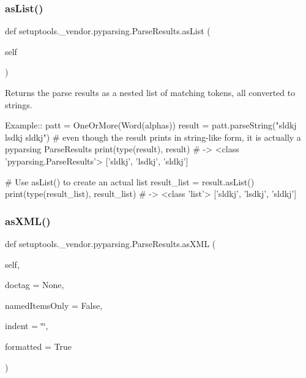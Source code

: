 \subsubsection{\texorpdfstring{as\+List()}{asList()}}
{\footnotesize\ttfamily def setuptools.\+\_\+vendor.\+pyparsing.\+Parse\+Results.\+as\+List (\begin{DoxyParamCaption}\item[{}]{self }\end{DoxyParamCaption})}

\begin{DoxyVerb}Returns the parse results as a nested list of matching tokens, all converted to strings.

Example::
    patt = OneOrMore(Word(alphas))
    result = patt.parseString("sldkj lsdkj sldkj")
    # even though the result prints in string-like form, it is actually a pyparsing ParseResults
    print(type(result), result) # -> <class 'pyparsing.ParseResults'> ['sldkj', 'lsdkj', 'sldkj']
    
    # Use asList() to create an actual list
    result_list = result.asList()
    print(type(result_list), result_list) # -> <class 'list'> ['sldkj', 'lsdkj', 'sldkj']
\end{DoxyVerb}
 \mbox{\label{classsetuptools_1_1__vendor_1_1pyparsing_1_1_parse_results_a1ef3733e1f8c5c2ad4a759b9c01809a9}} 
\subsubsection{\texorpdfstring{as\+X\+M\+L()}{asXML()}}
{\footnotesize\ttfamily def setuptools.\+\_\+vendor.\+pyparsing.\+Parse\+Results.\+as\+X\+ML (\begin{DoxyParamCaption}\item[{}]{self,  }\item[{}]{doctag = {\ttfamily None},  }\item[{}]{named\+Items\+Only = {\ttfamily False},  }\item[{}]{indent = {\ttfamily \char`\"{}\char`\"{}},  }\item[{}]{formatted = {\ttfamily True} }\end{DoxyParamCaption})}

